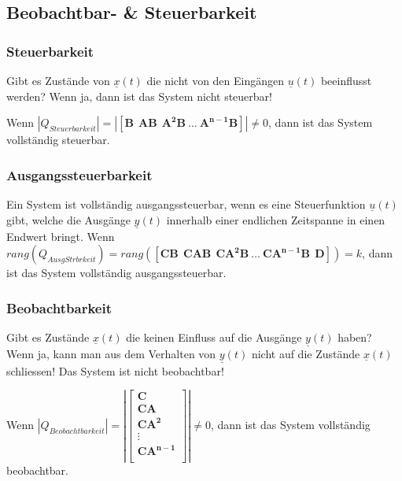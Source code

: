 \newpage
\subsection{Beobachtbar- \& Steuerbarkeit }
\subsubsection{Steuerbarkeit }
Gibt es Zustände von $\underline{x} (t)$ die nicht von den
Eingängen $\underline{u} (t)$ beeinflusst werden? Wenn ja,
dann ist das System nicht steuerbar!

Wenn $|Q_{Steuerbarkeit}|= \left| \left [ \boldsymbol{B~~AB~~ A^2B~\ldots~
A^{n-1}B} \right ] \right|  \neq 0$, dann ist das System vollständig steuerbar.

\subsubsection{Ausgangssteuerbarkeit}
Ein System ist vollständig ausgangssteuerbar, wenn es eine Steuerfunktion $\underline{u} (t)$ gibt,
welche die Ausgänge $\underline{y}(t)$ innerhalb einer endlichen Zeitspanne in einen Endwert bringt.
Wenn $rang(Q_{AusgStrbrkeit}) = rang \left( \left [ \boldsymbol{CB~~ CAB~~ CA^2B~\ldots~
CA^{n-1}B ~~ D}\right ] \right) = k$, dann ist das System vollständig ausgangssteuerbar.

\subsubsection{Beobachtbarkeit }
Gibt es Zustände $\underline{x}(t)$ die keinen Einfluss auf die Ausgänge
$\underline{y}(t)$ haben? Wenn ja, kann man aus dem Verhalten von 
$\underline{y}(t)$ nicht auf die Zustände $\underline{x}(t)$ schliessen!
Das System ist nicht beobachtbar!


Wenn $|Q_{Beobachtbarkeit}| = \left| \left [ \boldsymbol{
\begin{array}{c}
 C\\
 CA\\
CA^2\\
\vdots \\
CA^{n-1}\\
\end{array}}\right ] \right| \neq 0$, dann ist das System vollständig
beobachtbar.

